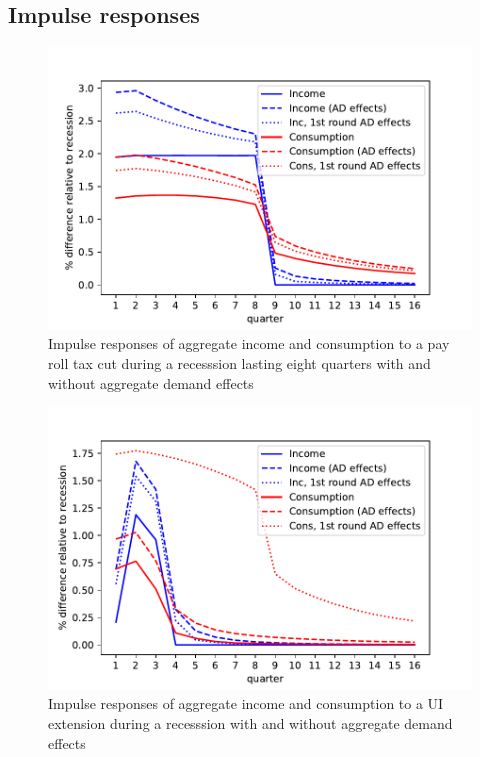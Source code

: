 \documentclass[11pt]{article}
\begin{document}
	\subsection{Impulse responses}
	
	
	\begin{figure}
		\centering
		\includegraphics[width=0.8\linewidth]{../Code/HA-Models/FromPandemicCode/Figures/recession_taxcut_relrecession}
		\caption{Impulse responses of aggregate income and consumption to a pay roll tax cut during a recesssion lasting eight quarters with and without aggregate demand effects}
		\label{fig:recessiontaxcutrelrecession}
	\end{figure}
	
	\begin{figure}
		\centering
		\includegraphics[width=0.8\linewidth]{../Code/HA-Models/FromPandemicCode/Figures/recession_UI_relrecession}
		\caption{Impulse responses of aggregate income and consumption to a UI extension during a recesssion with and without aggregate demand effects}
		\label{fig:recessionuirelrecession}
	\end{figure}
	
\end{document}
